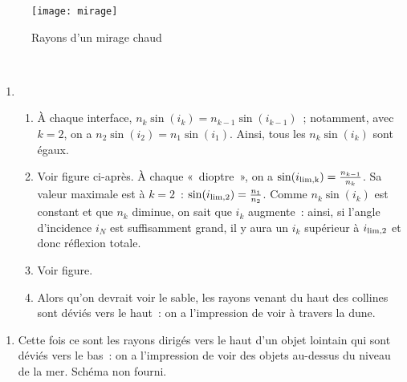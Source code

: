 \documentclass[a4paper, 12pt, final, garamond]{book}
\begin{document}
\begin{wrapfigure}[13]{R}{.5\linewidth}
    \vspace*{20pt}
    \centering
    \texttt{[image: mirage]}
    \captionsetup{justification=centering}
    \caption{Rayons d'un mirage chaud}
    \label{fig:mirage}
\end{wrapfigure}
~
\begin{enumerate}
    \item 
    \begin{enumerate}
        \item À chaque interface, $n_k\sin(i_k) = n_{k-1}\sin(i_{k-1})$~;
            notamment, avec $k=2$, on a $n_2\sin(i_2) = n_1\sin(i_1)$. Ainsi,
            tous les $n_k\sin(i_k)$ sont égaux.
        \item Voir figure ci-après.\smallbreak
            À chaque «~dioptre~», on a $\sin(i_{\rm lim, k}) =
            \frac{n_{k-1}}{n_k}$. Sa valeur maximale est à $k=2$~: $\sin(i_{\rm
            lim,2}) = \frac{n_1}{n_2}$. Comme $n_k\sin(i_k)$ est constant et que
            $n_k$ diminue, on sait que $i_k$ augmente~: ainsi, si l'angle
            d'incidence $i_N$ est suffisamment grand, il y aura un $i_k$
            supérieur à $i_{\rm lim,2}$ et donc réflexion totale.
        \item Voir figure.
        \item Alors qu'on devrait voir le sable, les rayons venant du haut des
            collines sont déviés vers le haut~: on a l'impression de voir à
            travers la dune.
    \end{enumerate}
\end{enumerate}

\begin{enumerate}[start=2]
    \item Cette fois ce sont les rayons dirigés vers le haut d'un objet lointain
        qui sont déviés vers le bas~: on a l'impression de voir des objets
        au-dessus du niveau de la mer. Schéma non fourni.
\end{enumerate}
\end{document}

